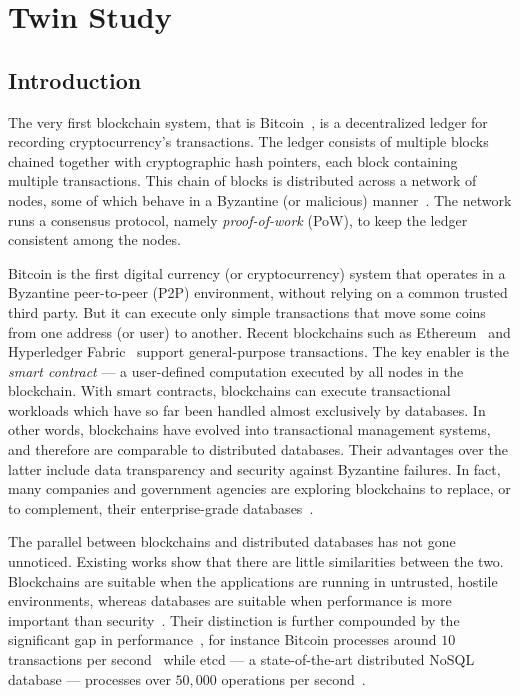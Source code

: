 \chapter{Twin Study}
\label{ch:twin}

\section{Introduction}
The very first blockchain system, that is Bitcoin~\cite{nakamoto2019bitcoin}, is a decentralized ledger for
recording cryptocurrency's transactions. The ledger consists of multiple blocks chained together with cryptographic
hash pointers, each block containing multiple transactions. This chain of blocks is distributed    
across a network of nodes, some of which behave in a Byzantine (or malicious) manner~\cite{Lamport_BFT}. The network runs a
consensus protocol, namely \textit{proof-of-work} (PoW), to keep the ledger consistent among the nodes.  

Bitcoin is the first digital currency (or cryptocurrency) system that
operates in a Byzantine \cite{Lamport_BFT} peer-to-peer (P2P) environment, without relying on a common trusted
third party.
But it can execute only simple transactions that move some coins from one address (or user) to another.
Recent blockchains such as Ethereum~\cite{wood2014ethereum} and Hyperledger
Fabric~\cite{androulaki2018hyperledger} support general-purpose transactions. The key enabler is the {\em
smart contract} --- a user-defined computation executed by all nodes in the blockchain. 
With smart contracts, blockchains can execute transactional workloads which have so far been handled almost
exclusively by 
databases.  In other words, blockchains have evolved into transactional management systems, and therefore are
comparable to distributed databases. Their advantages over the latter include data transparency and security
against Byzantine failures. 
In fact, many companies and government agencies are exploring blockchains to replace, or to complement, their
enterprise-grade databases~\cite{mougayar2016business,morabito2017business,crosby2016blockchain}.

The parallel between blockchains and distributed databases has not gone unnoticed. Existing works show that
there are little similarities between the two. Blockchains are suitable when the applications are running in
untrusted, hostile environments, whereas databases are
suitable when performance is more important than
security~\cite{crosby2016blockchain, wust2018you,chowdhury2018blockchain,yaga2018blockchain}. Their distinction is further compounded
by the significant gap in performance~\cite{dinh2017blockbench}, for instance Bitcoin processes around
$10$ transactions per second~\cite{bitcoin_tps} while etcd --- a state-of-the-art distributed NoSQL database
--- processes over $50,000$ operations per second~\cite{etcd_perf}.

